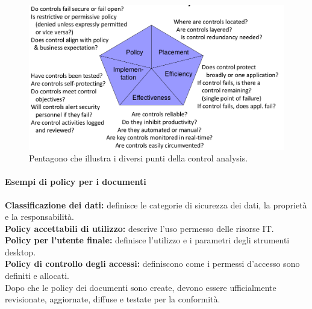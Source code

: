 \begin{figure}[h!]
        \begin{center}
                \includegraphics[scale=0.6]{res/img/penta}
        \end{center}
        \caption{Pentagono che illustra i diversi punti della control analysis.}
\end{figure}

\paragraph*{Esempi di policy per i documenti}

\textbf{Classificazione dei dati:} definisce le categorie di sicurezza dei dati, la 
proprietà e la responsabilità.\\
\newline
\textbf{Policy accettabili di utilizzo:} descrive l'uso permesso delle risorse IT.\\
\newline
\textbf{Policy per l'utente finale:} definisce l'utilizzo e i parametri degli strumenti 
desktop.\\
\newline
\textbf{Policy di controllo degli accessi:} definiscono come i permessi d'accesso sono 
definiti e allocati.\\
\newline
Dopo che le policy dei documenti sono create, devono essere ufficialmente revisionate, 
aggiornate, diffuse e testate per la conformità.
